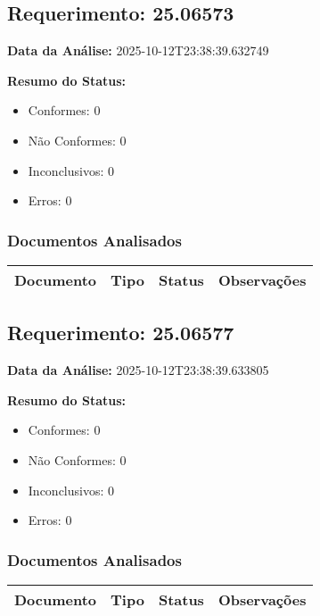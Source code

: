 \documentclass[12pt,a4paper]{article}
\begin{document}
\subsection{Requerimento: 25.06573}

\textbf{Data da Análise:} 2025-10-12T23:38:39.632749

\textbf{Resumo do Status:}
\begin{itemize}
    \item Conformes: 0
    \item Não Conformes: 0
    \item Inconclusivos: 0
    \item Erros: 0
\end{itemize}

\subsubsection{Documentos Analisados}

\begin{longtable}{|p{4cm}|p{2cm}|p{2cm}|p{6cm}|}
\hline
\textbf{Documento} & \textbf{Tipo} & \textbf{Status} & \textbf{Observações} \\
\hline
\endhead
\end{longtable}


\subsection{Requerimento: 25.06577}

\textbf{Data da Análise:} 2025-10-12T23:38:39.633805

\textbf{Resumo do Status:}
\begin{itemize}
    \item Conformes: 0
    \item Não Conformes: 0
    \item Inconclusivos: 0
    \item Erros: 0
\end{itemize}

\subsubsection{Documentos Analisados}

\begin{longtable}{|p{4cm}|p{2cm}|p{2cm}|p{6cm}|}
\hline
\textbf{Documento} & \textbf{Tipo} & \textbf{Status} & \textbf{Observações} \\
\hline
\endhead
\end{longtable}
\end{document}

